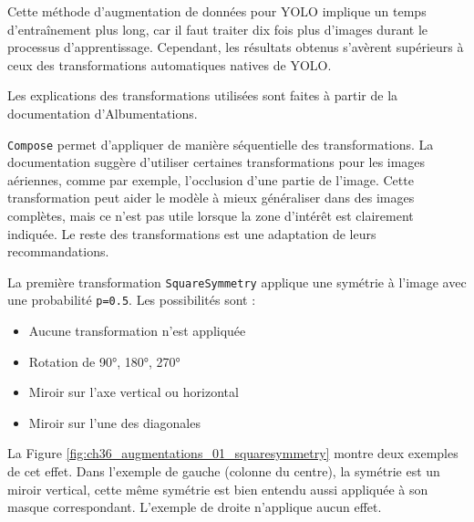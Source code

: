 Cette méthode d'augmentation de données pour YOLO implique un temps d'entraînement plus long, car il faut traiter dix fois plus d'images durant le processus d'apprentissage. Cependant, les résultats obtenus s'avèrent supérieurs à ceux des transformations automatiques natives de YOLO.

Les explications des transformations utilisées sont faites à partir de la documentation \cite{albumentations_documentation_nodate} d'Albumentations. 

\texttt{Compose} permet d'appliquer de manière séquentielle des transformations. La documentation suggère d'utiliser certaines transformations pour les images aériennes, comme par exemple, l'occlusion d'une partie de l'image. Cette transformation peut aider le modèle à mieux généraliser dans des images complètes, mais ce n'est pas utile lorsque la zone d'intérêt est clairement indiquée. Le reste des transformations est une adaptation de leurs recommandations.

La première transformation \texttt{SquareSymmetry} applique une symétrie à l'image avec une probabilité \texttt{p=0.5}. Les possibilités sont :
\begin{itemize}
    \item Aucune transformation n'est appliquée
    \item Rotation de 90°, 180°, 270°
    \item Miroir sur l'axe vertical ou horizontal
    \item Miroir sur l'une des diagonales
\end{itemize}

La Figure \ref{fig:ch36_augmentations_01_squaresymmetry} montre deux exemples de cet effet. Dans l'exemple de gauche (colonne du centre), la symétrie est un miroir vertical, cette même symétrie est bien entendu aussi appliquée à son masque correspondant. L'exemple de droite n'applique aucun effet.

